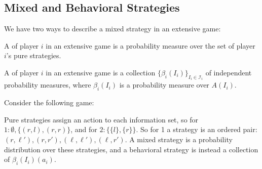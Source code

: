 \documentclass[10pt]{article}
\begin{document}
\subsection{Mixed and Behavioral Strategies}

We have two ways to describe a mixed strategy in an extensive game:

\begin{definition}
	A  of player $i$ in an extensive game is a probability measure over the set of player $i$'s pure strategies.
\end{definition}
\begin{definition}
	A  of player $i$ in an extensive game is a collection $\{\beta_i(I_i)\}_{I_i \in \mathscr{I}_i}$ of independent probability measures, where $\beta_i(I_i)$ is a probability measure over $A(I_i)$.
\end{definition}

\begin{example}
	 Consider the following game:
	\begin{figure}[H]
		\centering
	\end{figure}
	Pure strategies assign an action to each information set, so for $1: \emptyset,\{(r,l),(r,r)\}$, and for $2: \{\{l\},\{r\}\}$. So for 1 a strategy is an ordered pair: $(r,\ell'),(r,r'),(\ell,\ell'),(\ell,r')$. A mixed strategy is a probability distribution over these strategies, and a behavioral strategy is instead a collection of $\beta_i(I_i)(a_i)$. 
\end{example}
\end{document}
